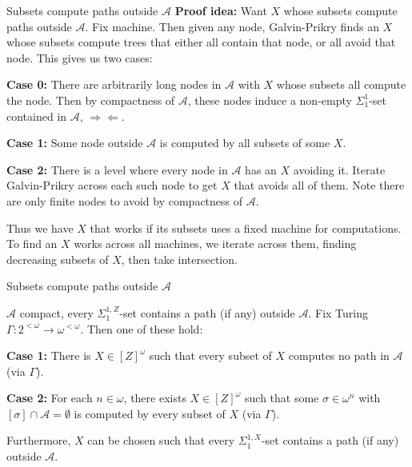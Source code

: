 \begin{frame}[shrink=5]{Subsets compute paths outside $\mathcal{A}$}
  \textbf{Proof idea:} Want $X$ whose subsets compute paths outside
  $\mathcal{A}$. Fix machine. Then given any node, Galvin-Prikry finds
  an $X$ whose subsets compute trees that either all contain that node, or
  all avoid that node. This gives us two cases:

  \vspace{1em}
  \textbf{Case 0:} There are arbitrarily long nodes in $\mathcal{A}$ with
  $X$ whose subsets all compute the node. Then by compactness of
  $\mathcal{A}$, these nodes induce a non-empty $\Sigma_1^1$-set contained
  in $\mathcal{A}$, $\Rightarrow\Leftarrow$.

  \vspace{0.5em}
  \textbf{Case 1:} Some node outside $\mathcal{A}$ is computed by all
  subsets of some $X$.

  \vspace{0.5em}
  \textbf{Case 2:} There is a level where every node in $\mathcal{A}$ has
  an $X$ avoiding it. Iterate Galvin-Prikry across each such node to get
  $X$ that avoids all of them. Note there are only finite nodes to avoid by
  compactness of $\mathcal{A}$.

  \vspace{1em}
  Thus we have $X$ that works if its subsets uses a fixed machine for
  computations. To find an $X$ works across all machines, we iterate across
  them, finding decreasing subsets of $X$, then take intersection.
\end{frame}

\begin{frame}{Subsets compute paths outside $\mathcal{A}$}
  \begin{lemma}
    $\mathcal{A}$ compact, every $\Sigma_1^{1,Z}$-set contains a path
    (if any) outside $\mathcal{A}$. Fix Turing $\Gamma:2^{<\omega}
    \rightarrow \omega^{<\omega}$. Then one of these hold:

    \vspace{0.5em}
    \textbf{Case 1:} There is $X\in[Z]^\omega$ such that every subset of
    $X$ computes no path in $\mathcal{A}$ (via $\Gamma$).

    \vspace{0.5em}
    \textbf{Case 2:} For each $n\in\omega$, there exists $X\in[Z]^\omega$
    such that some $\sigma\in\omega^n$ with
    $[\sigma]\cap\mathcal{A}=\emptyset$ is computed by every subset of $X$
    (via $\Gamma$).

    \vspace{0.5em}
    Furthermore, $X$ can be chosen such that every $\Sigma_1^{1,X}$-set
    contains a path (if any) outside $\mathcal{A}$.
  \end{lemma}
\end{frame}

